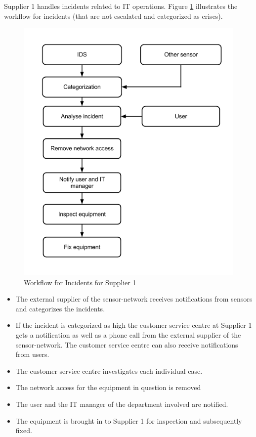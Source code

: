 Supplier 1 handles incidents related to IT operations. Figure \ref{fig:WorkflowCaseBSupplier1} illustrates the workflow for incidents (that are not escalated and categorized as crises).
\vspace{-0.7cm}
\begin{figure}[H]
\begin{center}
\includegraphics[scale=0.60]{WorkflowCaseBSupplier1.png}
\caption[Workflow for Incidents, Case B Supplier 1]{Workflow for Incidents for Supplier 1}
\label{fig:WorkflowCaseBSupplier1}
\end{center}
\end{figure}

\begin{itemize}
\item The external supplier of the sensor-network receives notifications from sensors and categorizes the incidents.
\item If the incident is categorized as high the customer service centre at Supplier 1 gets a notification as well as a phone call from the external supplier of the sensor-network. The customer service centre can also receive notifications from users.
\item The customer service centre investigates each individual case.
\item The network access for the equipment in question is removed 
\item The user and the IT manager of the department involved are notified.
\item The equipment is brought in to Supplier 1 for inspection and subsequently fixed.
\end{itemize}

